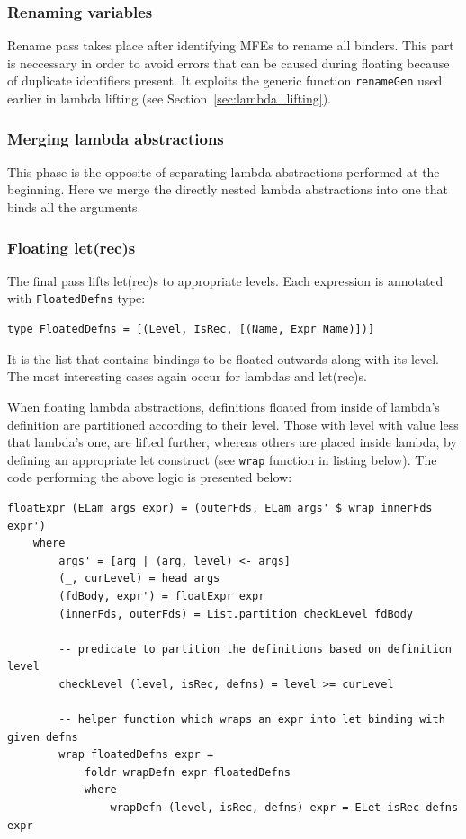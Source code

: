 \documentclass[12pt,a4paper]{report}
\begin{document}
\subsubsection{Renaming variables}
Rename pass takes place after identifying MFEs to rename all binders. This
part is neccessary in order to avoid errors that can be caused during floating
because of duplicate identifiers present. It exploits the generic function
\texttt{renameGen} used earlier in lambda lifting (see
Section~\ref{sec:lambda_lifting}).

\subsubsection{Merging lambda abstractions}
This phase is the opposite of separating lambda abstractions performed at the
beginning. Here we merge the directly nested lambda abstractions into one that
binds all the arguments.

\subsubsection{Floating let(rec)s}
The final pass lifts let(rec)s to appropriate levels. Each expression is
annotated with \texttt{FloatedDefns} type:

\vspace*{0.2in}
\begin{lstlisting}[style=haskell]
type FloatedDefns = [(Level, IsRec, [(Name, Expr Name)])]
\end{lstlisting}

It is the list that contains bindings to be floated outwards along with its
level. The most interesting cases again occur for lambdas and let(rec)s.

When floating lambda abstractions, definitions floated from inside of lambda's
definition are partitioned according to their level. Those with level with
value less that lambda's one, are lifted further, whereas others are placed
inside lambda, by defining an appropriate let construct (see \texttt{wrap}
function in listing below). The code performing the above logic is presented
below:

\vspace*{0.2in}
\begin{lstlisting}[style=haskell]
floatExpr (ELam args expr) = (outerFds, ELam args' $ wrap innerFds expr')
    where
        args' = [arg | (arg, level) <- args]
        (_, curLevel) = head args
        (fdBody, expr') = floatExpr expr
        (innerFds, outerFds) = List.partition checkLevel fdBody

        -- predicate to partition the definitions based on definition level
        checkLevel (level, isRec, defns) = level >= curLevel

        -- helper function which wraps an expr into let binding with given defns
        wrap floatedDefns expr =
            foldr wrapDefn expr floatedDefns
            where
                wrapDefn (level, isRec, defns) expr = ELet isRec defns expr
\end{lstlisting}
\end{document}
